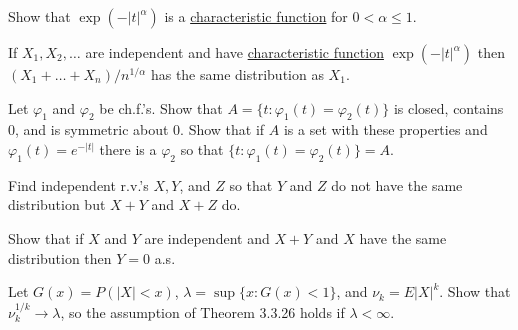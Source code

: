   \begin{exercise}[Durrett 3.3.19]
    Show that $\exp(-|t|^\alpha)$ is a \hyperref[def:characteristic-function]{characteristic function} for $0 < \alpha \leq 1$.
  \end{exercise}
  \begin{solution}

  \end{solution}

  \begin{exercise}[Durrett 3.3.20]
    If $X_1, X_2, \dots$ are independent and have \hyperref[def:characteristic-function]{characteristic function} $\exp(-|t|^\alpha)$ then $(X_1 + \dots + X_n)/n^{1/\alpha}$ has the same distribution as $X_1$.
  \end{exercise}
  \begin{solution}

  \end{solution}

  \begin{exercise}[Durrett 3.3.21]
    Let $\varphi_1$ and $\varphi_2$ be ch.f.'s. Show that $A = \{t : \varphi_1(t) = \varphi_2(t)\}$ is closed, contains 0, and is symmetric about 0. Show that if $A$ is a set with these properties and $\varphi_1(t) = e^{-|t|}$ there is a $\varphi_2$ so that $\{t : \varphi_1(t) = \varphi_2(t)\} = A$.
  \end{exercise}
  \begin{solution}

  \end{solution}

  \begin{exercise}[Durrett 3.3.22]
    Find independent r.v.'s $X, Y$, and $Z$ so that $Y$ and $Z$ do not have the same distribution but $X + Y$ and $X + Z$ do.
  \end{exercise}
  \begin{solution}

  \end{solution}

  \begin{exercise}[Durrett 3.3.23]
    Show that if $X$ and $Y$ are independent and $X + Y$ and $X$ have the same distribution then $Y = 0$ a.s.
  \end{exercise}
  \begin{solution}

  \end{solution}

  \begin{exercise}[Durrett 3.3.24]
    Let $G(x) = P(|X| < x)$, $\lambda = \sup\{x : G(x) < 1\}$, and $\nu_k = E|X|^k$. Show that $\nu_k^{1/k} \to \lambda$, so the assumption of Theorem 3.3.26 holds if $\lambda < \infty$.
  \end{exercise}
  \begin{solution}

  \end{solution}

